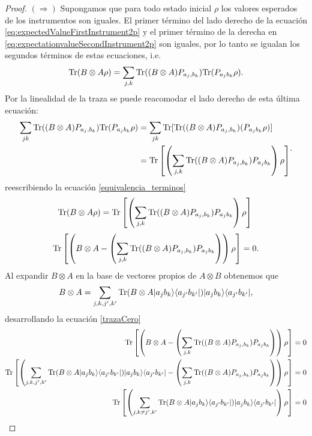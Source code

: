 \begin{proof}
    $(\Rightarrow)$ Supongamos que para todo estado inicial $\rho$ los valores
esperados de los instrumentos son iguales. El primer término del lado derecho
de la ecuación {\eqref{eq:expectedValueFirstInstrument2p}} y el primer término
de la derecha en {\eqref{eq:expectationvalueSecondInstrument2p}} son iguales,
por lo tanto se igualan los segundos términos de estas ecuaciones,
i.e.\begin{equation}\label{equivalencia_terminos}{\rm Tr}(B\otimes A
\rho)=\sum_{j,k}{\rm Tr}((B\otimes A) P_{a_j,b_k}){\rm Tr}(P_{a_j b_k}\rho
).\end{equation} Por la linealidad de la traza se puede reacomodar el lado
derecho de esta última ecuación: 
\[\begin{split}\sum_{jk}{\rm Tr}((B\otimes A)
P_{a_j,b_k}){\rm Tr}(P_{a_j b_k}\rho )&= \sum_{jk}{\rm Tr}[{\rm Tr}((B\otimes A)
P_{a_j,b_k})(P_{a_j b_k}\rho )]\\
        &={\rm Tr}\left[\left(\sum_{j,k}{\rm Tr}((B\otimes A) P_{a_j,b_k})P_{a_j b_k}\right)\rho \right]\end{split}.\]  reescribiendo la ecuación {\ref{equivalencia_terminos}} 
        \[{\rm Tr}(B\otimes A \rho)={\rm Tr}\left[\left(\sum_{j,k}{\rm Tr}((B\otimes A) P_{a_j,b_k})P_{a_j b_k}\right)\rho \right]\\ \]
    \begin{equation}\label{trazaCero}\begin{split}
        {\rm Tr}\left[\left(B\otimes A-\left(\sum_{j,k}{\rm Tr}((B\otimes A) P_{a_j,b_k})P_{a_j b_k}\right)\right)\rho \right]=0\\ \end{split}.\end{equation}
        Al expandir $B\otimes A$ en la base de vectores propios de $A\otimes B$ obtenemos que \[B\otimes A=\sum_{j,k,j',k'}{\rm Tr}(B\otimes A |a_j b_k\rangle \langle a_{j'}b_{k'}|)|a_j b_k\rangle \langle a_{j'}b_{k'}|,\] desarrollando la ecuación {\ref{trazaCero}}   
    \[\begin{split}
        \tr\left[\left(B\otimes A-\left(\sum_{j,k}\tr((B\otimes A) P_{a_j,b_k})P_{a_j b_k}\right)\right)\rho\right]&=0\\
    \tr\left[\left(\sum_{j,k,j',k'}\tr(B\otimes A |a_j b_k\rala a_{j'}b_{k'}|)|a_j b_k\rala a_{j'}b_{k'}|-\left(\sum_{j,k}\tr((B\otimes A) P_{a_j,b_k})P_{a_j b_k}\right)\right)\rho\right]&=0\\
    \tr\left[\left(\sum_{j,k\ne j',k'}\tr(B\otimes A |a_j b_k\rala a_{j'}b_{k'}|)|a_j b_k\rala a_{j'}b_{k'}|\right)\rho\right]&=0\\

\end{split}\]
\end{proof}
